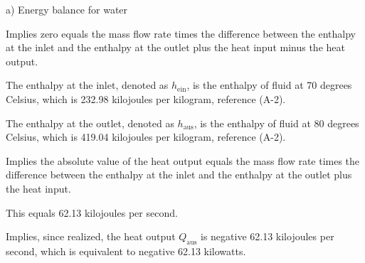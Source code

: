 a) Energy balance for water

Implies zero equals the mass flow rate times the difference between the enthalpy at the inlet and the enthalpy at the outlet plus the heat input minus the heat output.

The enthalpy at the inlet, denoted as \( h_{\text{ein}} \), is the enthalpy of fluid at 70 degrees Celsius, which is 232.98 kilojoules per kilogram, reference (A-2).

The enthalpy at the outlet, denoted as \( h_{\text{aus}} \), is the enthalpy of fluid at 80 degrees Celsius, which is 419.04 kilojoules per kilogram, reference (A-2).

Implies the absolute value of the heat output equals the mass flow rate times the difference between the enthalpy at the inlet and the enthalpy at the outlet plus the heat input.

This equals 62.13 kilojoules per second.

Implies, since realized, the heat output \( Q_{\text{aus}} \) is negative 62.13 kilojoules per second, which is equivalent to negative 62.13 kilowatts.